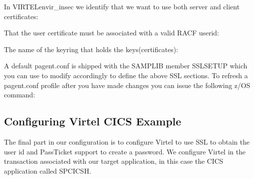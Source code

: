 \documentclass[letterpaper,10pt,english]{sphinxmanual}
\begin{document}
\sphinxAtStartPar
In VIRTELenvir\_insec we identify that we want to use both server and client certificates:

\begin{sphinxVerbatim}[commandchars=\\\{\}]
   
\end{sphinxVerbatim}

\sphinxAtStartPar
That the user certificate must be associated with a valid RACF userid:

\begin{sphinxVerbatim}[commandchars=\\\{\}]
  
\end{sphinxVerbatim}

\sphinxAtStartPar
The name of the keyring that holds the keys(certificates):

\begin{sphinxVerbatim}[commandchars=\\\{\}]
     
\end{sphinxVerbatim}

\sphinxAtStartPar
A default pagent.conf is shipped with the SAMPLIB member SSLSETUP which you can use to modify accordingly to define the above SSL sections. To refresh a pagent.conf profile after
you have made changes you can issue the following z/OS command:

\begin{sphinxVerbatim}[commandchars=\\\{\}]
 
\end{sphinxVerbatim}

\ignorespaces 

\subsection{Configuring Virtel \sphinxhyphen{} CICS Example}
\label{\detokenize{Customization:configuring-virtel-cics-example}}\label{\detokenize{Customization:index-113}}
\sphinxAtStartPar
The final part in our configuration is to configure Virtel to use SSL to obtain the user id and PassTicket support to create a password. We configure Virtel in the transaction associated with our target application, in this case the CICS application called SPCICSH.
\end{document}
